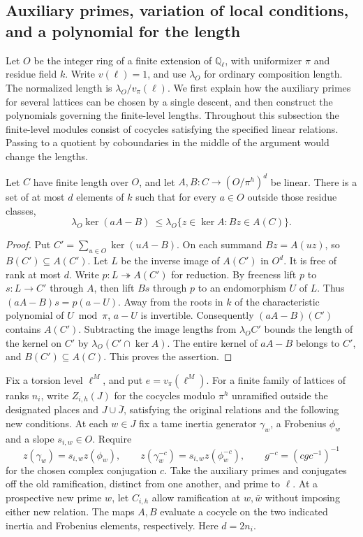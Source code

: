 \subsection{Auxiliary primes, variation of local conditions, and a polynomial for the length}
\label{sec:selmer-polynomial-descent}
Let $O$ be the integer ring of a finite extension of $\mathbb Q_\ell$, with uniformizer
$\pi$ and residue field $k$. Write $v(\ell)=1$, and use $\lambda_O$ for ordinary
composition length. The normalized length is $\lambda_O/v_\pi(\ell)$.
We first explain how the auxiliary primes for several lattices can be chosen by a
single descent, and then construct the polynomials governing the finite-level lengths.
Throughout this subsection the finite-level modules consist of cocycles satisfying
the specified linear relations. Passing to a quotient by coboundaries in the
middle of the argument would change the lengths.

\begin{lemma}\label{lem:selmer-tilt}
Let $C$ have finite length over $O$, and let $A,B:C\to(O/\pi^h)^d$ be linear.
There is a set of at most $d$ elements of $k$ such that for every $a\in O$
outside those residue classes,
\[
 \lambda_O\ker(aA-B)\ \leq \lambda_O\{z\in\ker A:Bz\in A(C)\}.
\]
\end{lemma}
\begin{proof}
Put $C'=\sum_{u\in O}\ker(uA-B)$. On each summand $Bz=A(uz)$, so
$B(C')\subseteq A(C')$. Let $L$ be the inverse image of $A(C')$ in $O^d$.
It is free of rank at most $d$. Write $p:L\twoheadrightarrow A(C')$ for reduction.
By freeness lift $p$ to $s:L\to C'$ through $A$, then lift $Bs$ through $p$
to an endomorphism $U$ of $L$. Thus $(aA-B)s=p(a-U)$. Away from the roots
in $k$ of the characteristic polynomial of $U\bmod\pi$, $a-U$ is invertible.
Consequently $(aA-B)(C')$ contains $A(C')$. Subtracting the image lengths
from $\lambda_O C'$ bounds the length of the kernel on $C'$ by
$\lambda_O(C'\cap\ker A)$. The entire kernel of $aA-B$ belongs to $C'$,
and $B(C')\subseteq A(C)$. This proves the assertion.
\end{proof}

Fix a torsion level $\ell^M$, and put $e=v_\pi(\ell^M)$.
For a finite family of lattices of ranks $n_i$, write $Z_{i,h}(J)$ for the
cocycles modulo $\pi^h$ unramified outside the designated places and $J\cup\bar J$,
satisfying the original relations and the following new conditions.
At each $w\in J$ fix a tame inertia generator $\gamma_w$, a Frobenius
$\phi_w$ and a slope $s_{i,w}\in O$. Require
\[
 z(\gamma_w)=s_{i,w}z(\phi_w),\qquad
 z(\gamma_w^{-c})=s_{i,w}z(\phi_w^{-c}),\qquad
 g^{-c}=(cgc^{-1})^{-1}
\]
for the chosen complex conjugation $c$. Take the auxiliary primes and conjugates
off the old ramification, distinct from one another, and prime to $\ell$.
At a prospective new prime $w$, let $C_{i,h}$ allow ramification at $w,\bar w$
without imposing either new relation. The maps $A,B$ evaluate a cocycle on the
two indicated inertia and Frobenius elements, respectively. Here $d=2n_i$.

